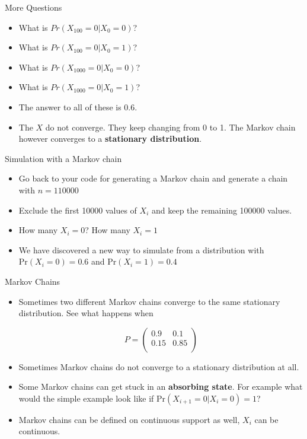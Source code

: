 \documentclass[10pt]{beamer}
\begin{document}
\begin{frame}{More Questions}
\begin{itemize}
\item What is $Pr(X_{100}=0|X_0=0)$?

\item What is $Pr(X_{100}=0|X_0=1)$?

\item What is $Pr(X_{1000}=0|X_0=0)$?

\item What is $Pr(X_{1000}=0|X_0=1)$?

\item The answer to all of these is 0.6.

\item The $X$ do not converge.  They keep changing from 0 to 1.  The Markov chain however converges to a {\bf stationary distribution}.
\end{itemize}
\end{frame}
\begin{frame}{Simulation with  a Markov chain}
\begin{itemize}
\item Go back to your code for generating a Markov chain and generate a chain with $n=110000$

\item Exclude the first 10000 values of $X_i$ and keep the remaining 100000 values.

\item How many $X_i=0$? How many $X_i=1$

\item We have discovered a new way to simulate from a distribution with $\mbox{Pr}(X_i=0)=0.6$
and $\mbox{Pr}(X_i=1)=0.4$
\end{itemize}
\end{frame}
\begin{frame}{Markov Chains}
\begin{itemize}
\item Sometimes two different Markov chains converge to the same stationary distribution.  See what happens when

\begin{equation}
P=\left(
\begin{array}{cc}
0.9 & 0.1\\0.15 & 0.85\\
\end{array}
\right)
\end{equation}

\item Sometimes Markov chains do not converge to a stationary distribution at all.

\item Some Markov chains can get stuck in an {\bf absorbing state}.  For example what would the simple example look like if $\mbox{Pr}(X_{i+1}=0|X_{i}=0)=1$?

\item Markov chains can be defined on continuous support as well, $X_i$ can be continuous.
\end{itemize}
\end{frame}
\end{document}
